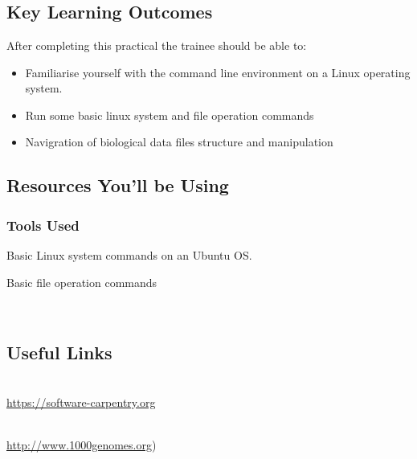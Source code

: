 




\chapter{\moduleTitle}
\newpage

\section{Key Learning Outcomes}

After completing this practical the trainee should be able to:
\begin{itemize}
  \item Familiarise yourself with the command line environment on a Linux operating system.
  \item Run some basic linux system and file operation commands
  \item Navigration of biological data files structure and manipulation
\end{itemize}

\section{Resources You'll be Using}
 
\subsection{Tools Used}
\begin{description}[style=multiline,labelindent=0cm,align=left,leftmargin=0.5cm]
  \item Basic Linux system commands on an Ubuntu OS.
 \item Basic file operation commands 
\end{description}\

\section{Useful Links}
 
\begin{description}[style=multiline,labelindent=0cm,align=left,leftmargin=0.5cm]
  \item [Software Carpentry]\hfill\\
    \url{https://software-carpentry.org}
  \item [1000Genome Project data for example]\hfill\\
    \url{http://www.1000genomes.org})
\end{description}

